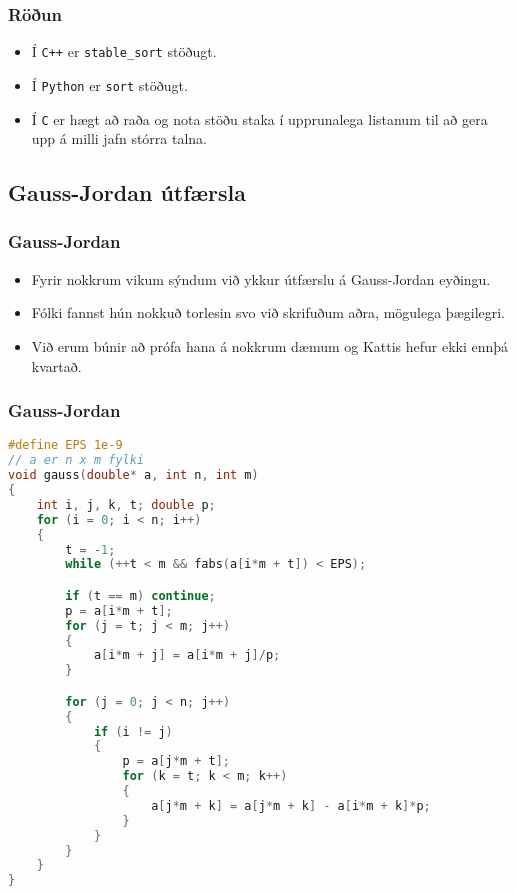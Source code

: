 \documentclass{beamer}
\begin{document}
\begin{frame}
	\frametitle{Röðun}
	\begin{itemize}
		\item<1-> Í \texttt{C++} er \texttt{stable\_sort} stöðugt.
		\item<2-> Í \texttt{Python} er \texttt{sort} stöðugt.
		\item<3-> Í \texttt{C} er hægt að raða og nota stöðu staka í upprunalega listanum
			til að gera upp á milli jafn stórra talna.
	\end{itemize}
\end{frame}

\subsection{Gauss-Jordan útfærsla}

\begin{frame}
	\frametitle{Gauss-Jordan}
	\begin{itemize}
		\item<1-> Fyrir nokkrum vikum sýndum við ykkur útfærslu á Gauss-Jordan eyðingu.
		\item<2-> Fólki fannst hún nokkuð torlesin svo við skrifuðum aðra, mögulega þægilegri.
		\item<3-> Við erum búnir að prófa hana á nokkrum dæmum og Kattis hefur ekki ennþá kvartað.
	\end{itemize}
\end{frame}

\begin{frame}[fragile]
	\frametitle{Gauss-Jordan}
	\tiny
	\begin{lstlisting}[language=C]
#define EPS 1e-9
// a er n x m fylki
void gauss(double* a, int n, int m)
{
	int i, j, k, t; double p;
	for (i = 0; i < n; i++)
	{
		t = -1;
		while (++t < m && fabs(a[i*m + t]) < EPS);

		if (t == m) continue;
		p = a[i*m + t];
		for (j = t; j < m; j++)
		{
			a[i*m + j] = a[i*m + j]/p;
		}

		for (j = 0; j < n; j++)
		{
			if (i != j)
			{
				p = a[j*m + t];
				for (k = t; k < m; k++)
				{
					a[j*m + k] = a[j*m + k] - a[i*m + k]*p;
				}
			}
		}
	}
}
	\end{lstlisting}
\end{frame}
\end{document}
